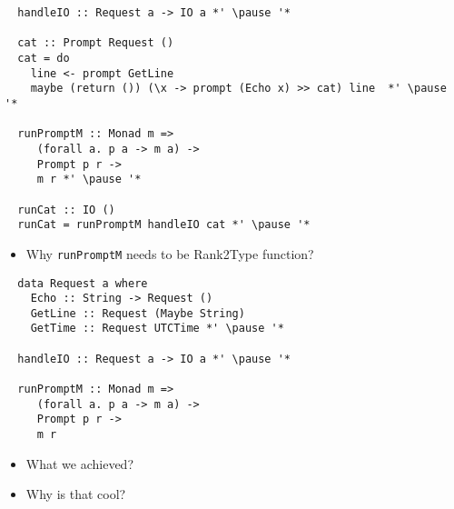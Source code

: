 \documentclass[aspectratio=43]{beamer}
\begin{document}
\begin{frame}[fragile]
 \begin{lstlisting}
  handleIO :: Request a -> IO a *' \pause '*
  
  cat :: Prompt Request ()
  cat = do
    line <- prompt GetLine
    maybe (return ()) (\x -> prompt (Echo x) >> cat) line  *' \pause '*
  
  runPromptM :: Monad m =>
     (forall a. p a -> m a) ->
     Prompt p r ->
     m r *' \pause '*
  
  runCat :: IO ()
  runCat = runPromptM handleIO cat *' \pause '*
 \end{lstlisting}
\end{frame}

\begin{frame}[fragile]
 \begin{itemize}
  \item Why \texttt{runPromptM} needs to be Rank2Type function?
 \end{itemize}
 \begin{lstlisting}
  data Request a where
    Echo :: String -> Request ()
    GetLine :: Request (Maybe String)
    GetTime :: Request UTCTime *' \pause '*
    
  handleIO :: Request a -> IO a *' \pause '*
  
  runPromptM :: Monad m =>
     (forall a. p a -> m a) ->
     Prompt p r ->
     m r
 \end{lstlisting}
\end{frame}

\begin{frame}
 \begin{itemize}
  \item What we achieved?
  \pause
  \item Why is that cool?
 \end{itemize}
\end{frame}
\end{document}
